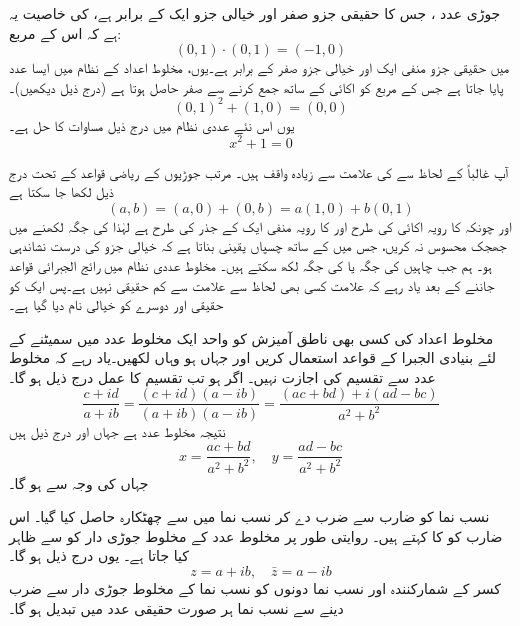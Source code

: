 جوڑی عدد ، جس کا حقیقی جزو صفر  اور خیالی جزو ایک کے برابر ہے، کی خاصیت یہ ہے کہ اس کے مربع:
\[(0,1)\cdot(0,1)=(-1,0)\]
میں حقیقی جزو  منفی ایک اور خیالی جزو صفر کے برابر ہے۔یوں، مخلوط اعداد  کے نظام میں  ایسا عدد  پایا جاتا ہے جس کے  مربع  کو اکائی کے ساتھ جمع کرنے سے    صفر   حاصل ہوتا ہے (درج ذیل دیکھیں)۔
\[(0,1)^2+(1,0)=(0,0)\]
یوں اس نئے عددی نظام میں درج ذیل مساوات  کا حل  ہے۔
\[x^2+1=0\]

آپ غالباً   کے لحاظ سے   کی  علامت سے زیادہ واقف ہیں۔ مرتب جوڑیوں کے  ریاضی قواعد کے تحت درج ذیل لکھا جا سکتا ہے
\[(a,b)=(a,0)+(0,b)=a(1,0)+b(0,1)\]
اور چونکہ   کا رویہ اکائی کی طرح اور   کا رویہ منفی ایک کے جذر کی طرح  ہے لہٰذا  کی جگہ   لکھنے میں جھجک محسوس نہ  کریں، جس میں  کے ساتھ چسپاں   یقینی بناتا ہے کہ خیالی جزو کی درست نشاندہی ہو۔ ہم جب چاہیں  کی جگہ  یا  کی جگہ  لکھ سکتے ہیں۔ مخلوط عددی نظام   میں رائج  الجبرائی قواعد جاننے کے بعد    یاد رہے کہ علامت   کسی بھی لحاظ سے علامت  سے کم حقیقی نہیں ہے۔پس ایک کو حقیقی اور دوسرے کو خیالی نام  دیا  گیا ہے۔

مخلوط اعداد کی کسی بھی  ناطق  آمیزش   کو واحد ایک مخلوط عدد میں  سمیٹنے کے لئے بنیادی الجبرا کے قواعد استعمال کریں اور جہاں  ہو وہاں    لکھیں۔یاد رہے کہ  مخلوط عدد  سے تقسیم کی اجازت نہیں۔ اگر  ہو تب تقسیم کا عمل درج ذیل ہو گا۔
\[\dfrac{c+id}{a+ib}=\dfrac{(c+id)(a-ib)}{(a+ib)(a-ib)}=\dfrac{(ac+bd)+i(ad-bc)}{a^2+b^2}\]
نتیجہ مخلوط عدد  ہے جہاں  اور  درج ذیل ہیں
\[x=\dfrac{ac+bd}{a^2+b^2},\quad y=\dfrac{ad-bc}{a^2+b^2}\]
جہاں  کی وجہ سے  ہو گا۔

نسب نما    کو   ضارب    سے ضرب دے کر نسب  نما میں    سے چھٹکارہ  حاصل کیا گیا۔ اس ضارب کو   کا  کہتے ہیں۔   روایتی طور پر  مخلوط عدد  کے مخلوط جوڑی دار کو    سے ظاہر کیا جاتا ہے۔ یوں درج ذیل ہو گا۔
\[z=a+ib,\quad \bar{z}=a-ib\]
کسر  کے  شمارکنندہ اور نسب نما دونوں  کو نسب نما کے   مخلوط جوڑی دار سے ضرب دینے سے نسب نما  ہر صورت حقیقی عدد میں تبدیل ہو گا۔

